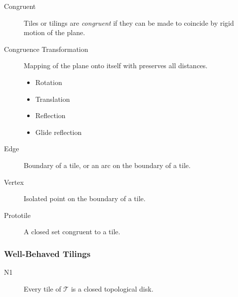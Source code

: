 \documentclass{beamer}
\begin{document}
\begin{frame} 

\begin{description} 
    \item[Congruent] Tiles or tilings are \emph{congruent} if they can be made to coincide by rigid motion of the plane. 
    \item[Congruence Transformation] Mapping of the plane onto itself with preserves all distances. 
        \begin{itemize} 
            \item Rotation 
            \item Translation 
            \item Reflection 
            \item Glide reflection 
        \end{itemize} 
\end{description} 

\end{frame} 

\begin{frame} 

\begin{description} 
    \item[Edge] Boundary of a tile, or an arc on the boundary of a tile.
    \item[Vertex] Isolated point on the boundary of a tile.
\end{description} 

\end{frame} 

\begin{frame} 

\begin{description} 
    \item[Prototile] A closed set congruent to a tile.
\end{description} 

\end{frame} 

\begin{frame} 
    \frametitle{Well-Behaved Tilings} 
    \begin{description} 
        \item[N1] Every tile of $\mathscr{T}$ is a closed topological disk.
    \end{description} 
    \begin{figure} 
        \center 
         
    \end{figure} 
\end{frame} 
\end{document}
